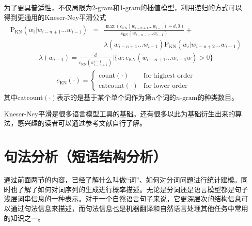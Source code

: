 \parinterval 为了更具普适性，不仅局限为2-gram和1-gram的插值模型，利用递归的方式可以得到更通用的Kneser-Ney平滑公式
\begin{eqnarray}
\textrm{P}_{\textrm{KN}}(w_i|w_{i-n+1} ...w_{i-1}) & = & \frac{\max(c_{\textrm{KN}}(w_{i-n+1}...w_{i-1})-d,0)}{c_{\textrm{KN}}(w_{i-n+1}...w_{i-1})} + \nonumber \\
                                                   &   &  \lambda(w_{i-n+1}...w_{i-1})\textrm{P}_{\textrm{KN}}(w_i|w_{i-n+2}...w_{i-1})
\label{eq:2-39}
\end{eqnarray}
\begin{eqnarray}
\lambda(w_{i-1}) =  \frac{d}{c_{\textrm{KN}}(w_{i-n+1}^{i-1})}|\{w:c_{\textrm{KN}}(w_{i-n+1}...w_{i-1}w)>0\}
\label{eq:2-40}
\end{eqnarray}
\begin{eqnarray}
c_{\textrm{KN}}(\cdot) = \left\{\begin{array}{ll}
\textrm{count}(\cdot) & \textrm{for\ highest\ order}  \\
\textrm{catcount}(\cdot) & \textrm{for\ lower\ order}
\end{array}\right.
\label{eq:2-41}
\end{eqnarray}
\noindent 其中catcount$(\cdot)$表示的是基于某个单个词作为第$n$个词的$n$-gram的种类数目。

\parinterval Kneser-Ney平滑是很多语言模型工具的基础\cite{wang-etal-2018-niutrans}\cite{heafield-2011-kenlm}\cite{stolcke2002srilm}。还有很多以此为基础衍生出来的算法，感兴趣的读者可以通过参考文献自行了解\cite{parsing2009speech}\cite{ney1994structuring}\cite{chen1999empirical}。


\sectionnewpage
\section{句法分析（短语结构分析）}
\parinterval 通过前面两节的内容，已经了解什么叫做``词''、如何对分词问题进行统计建模。同时也了解了如何对词序列的生成进行概率描述。无论是分词还是语言模型都是句子浅层词串信息的一种表示。对于一个自然语言句子来说，它更深层次的结构信息可以通过句法信息来描述，而句法信息也是机器翻译和自然语言处理其他任务中常用的知识之一。


